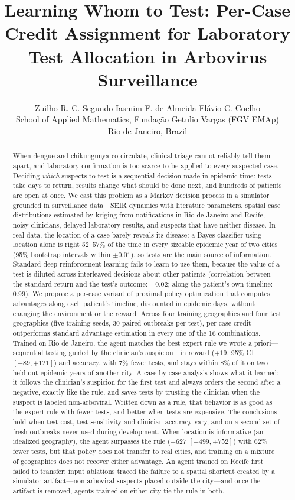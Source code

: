 \documentclass[11pt,a4paper]{article}
\title{\textbf{Learning Whom to Test: Per-Case Credit Assignment for Laboratory Test Allocation in Arbovirus Surveillance}}
\author{
    Zuilho R. C. Segundo \quad Iasmim F. de Almeida \quad Flávio C. Coelho \\[0.3cm]
    \small School of Applied Mathematics, Fundação Getulio Vargas (FGV EMAp) \\
    \small Rio de Janeiro, Brazil
}
\date{}
\begin{document}
\maketitle

\begin{abstract}
\noindent When dengue and chikungunya co-circulate, clinical triage cannot reliably tell them apart, and laboratory confirmation is too scarce to be applied to every suspected case. Deciding \emph{which} suspects to test is a sequential decision made in epidemic time: tests take days to return, results change what should be done next, and hundreds of patients are open at once. We cast this problem as a Markov decision process in a simulator grounded in surveillance data---SEIR dynamics with literature parameters, spatial case distributions estimated by kriging from notifications in Rio de Janeiro and Recife, noisy clinicians, delayed laboratory results, and suspects that have neither disease. In real data, the location of a case barely reveals its disease: a Bayes classifier using location alone is right 52--57\% of the time in every sizeable epidemic year of two cities (95\% bootstrap intervals within $\pm0.01$), so tests are the main source of information. Standard deep reinforcement learning fails to learn to use them, because the value of a test is diluted across interleaved decisions about other patients (correlation between the standard return and the test's outcome: $-0.02$; along the patient's own timeline: $0.99$). We propose a per-case variant of proximal policy optimization that computes advantages along each patient's timeline, discounted in epidemic days, without changing the environment or the reward. Across four training geographies and four test geographies (five training seeds, 30 paired outbreaks per test), per-case credit outperforms standard advantage estimation in every one of the 16 combinations. Trained on Rio de Janeiro, the agent matches the best expert rule we wrote a priori---sequential testing guided by the clinician's suspicion---in reward ($+19$, 95\% CI $[-89, +121]$) and accuracy, with 7\% fewer tests, and stays within 8\% of it on two held-out epidemic years of another city. A case-by-case analysis shows what it learned: it follows the clinician's suspicion for the first test and always orders the second after a negative, exactly like the rule, and saves tests by trusting the clinician when the suspect is labeled non-arboviral. Written down as a rule, that behavior is as good as the expert rule with fewer tests, and better when tests are expensive. The conclusions hold when test cost, test sensitivity and clinician accuracy vary, and on a second set of fresh outbreaks never used during development. When location is informative (an idealized geography), the agent surpasses the rule ($+627$ $[+499, +752]$) with 62\% fewer tests, but that policy does not transfer to real cities, and training on a mixture of geographies does not recover either advantage. An agent trained on Recife first failed to transfer; input ablations traced the failure to a spatial shortcut created by a simulator artifact---non-arboviral suspects placed outside the city---and once the artifact is removed, agents trained on either city tie the rule in both.


\end{abstract}
\end{document}
